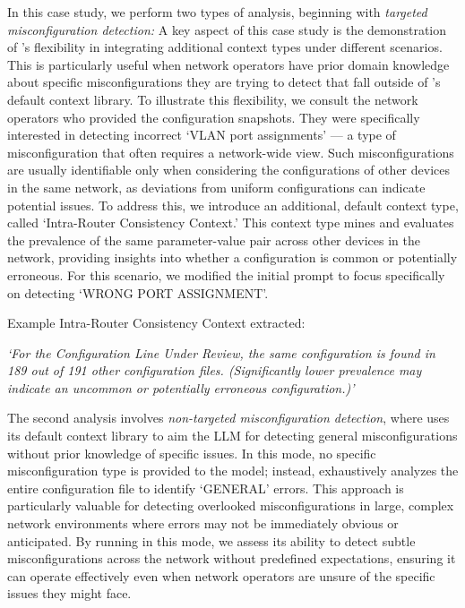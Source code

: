 In this case study, we perform two types of analysis, beginning with \textit{targeted misconfiguration detection:} A key aspect of this case study is the demonstration of \sysname{}'s flexibility in integrating additional context types under different scenarios. This is particularly useful when network operators have prior domain knowledge about specific misconfigurations they are trying to detect that fall outside of \sysname{}'s default context library.
To illustrate this flexibility, we consult the network operators who provided the configuration snapshots. They were specifically interested in detecting incorrect `VLAN port assignments' --- a type of misconfiguration that often requires a network-wide view. Such misconfigurations are usually identifiable only when considering the configurations of other devices in the same network, as deviations from uniform configurations can indicate potential issues.
To address this, we introduce an additional, default context type, called `Intra-Router Consistency Context.' This context type mines and evaluates the prevalence of the same parameter-value pair across other devices in the network, providing insights into whether a configuration is common or potentially erroneous. For this scenario, we modified the initial prompt to focus specifically on detecting `WRONG PORT ASSIGNMENT'.

Example Intra-Router Consistency Context extracted:

\textit{`For the Configuration Line Under Review, the same configuration is found in 189 out of 191 other configuration files. (Significantly lower prevalence may indicate an uncommon or potentially erroneous configuration.)'}

The second analysis involves \textit{non-targeted misconfiguration detection}, where \sysname{} uses its default context library to aim the LLM for detecting general misconfigurations without prior knowledge of specific issues. In this mode, no specific misconfiguration type is provided to the model; instead, \sysname{} exhaustively analyzes the entire configuration file to identify `GENERAL' errors. 
This approach is particularly valuable for detecting overlooked misconfigurations in large, complex network environments where errors may not be immediately obvious or anticipated. By running \sysname{} in this mode, we assess its ability to detect subtle misconfigurations across the network without predefined expectations, ensuring it can operate effectively even when network operators are unsure of the specific issues they might face.

